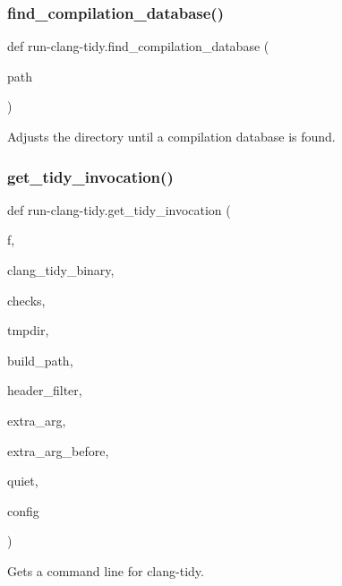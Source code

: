 \subsubsection{\texorpdfstring{find\+\_\+compilation\+\_\+database()}{find\_compilation\_database()}}
{\footnotesize\ttfamily def run-\/clang-\/tidy.\+find\+\_\+compilation\+\_\+database (\begin{DoxyParamCaption}\item[{}]{path }\end{DoxyParamCaption})}

\begin{DoxyVerb}Adjusts the directory until a compilation database is found.\end{DoxyVerb}
 \mbox{\label{namespacerun-clang-tidy_a3cbee7957a6ad49d8a88b9c9d74a53dc}} 
\subsubsection{\texorpdfstring{get\+\_\+tidy\+\_\+invocation()}{get\_tidy\_invocation()}}
{\footnotesize\ttfamily def run-\/clang-\/tidy.\+get\+\_\+tidy\+\_\+invocation (\begin{DoxyParamCaption}\item[{}]{f,  }\item[{}]{clang\+\_\+tidy\+\_\+binary,  }\item[{}]{checks,  }\item[{}]{tmpdir,  }\item[{}]{build\+\_\+path,  }\item[{}]{header\+\_\+filter,  }\item[{}]{extra\+\_\+arg,  }\item[{}]{extra\+\_\+arg\+\_\+before,  }\item[{}]{quiet,  }\item[{}]{config }\end{DoxyParamCaption})}

\begin{DoxyVerb}Gets a command line for clang-tidy.\end{DoxyVerb}
 \mbox{\label{namespacerun-clang-tidy_a3a4dae083818b9d5c9104e0142e03e3b}} 
